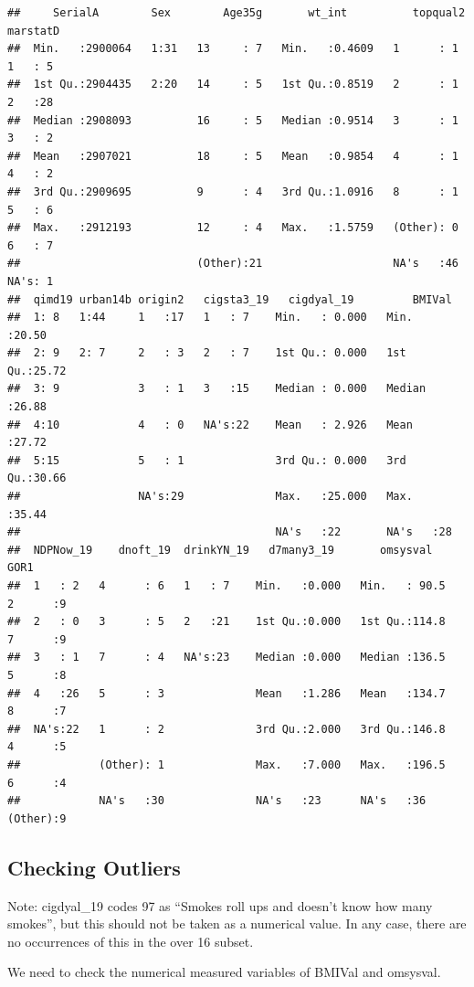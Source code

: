 \documentclass[
  11pt,
]{article}
\begin{document}
\begin{verbatim}
##     SerialA        Sex        Age35g       wt_int          topqual2  marstatD 
##  Min.   :2900064   1:31   13     : 7   Min.   :0.4609   1      : 1   1   : 5  
##  1st Qu.:2904435   2:20   14     : 5   1st Qu.:0.8519   2      : 1   2   :28  
##  Median :2908093          16     : 5   Median :0.9514   3      : 1   3   : 2  
##  Mean   :2907021          18     : 5   Mean   :0.9854   4      : 1   4   : 2  
##  3rd Qu.:2909695          9      : 4   3rd Qu.:1.0916   8      : 1   5   : 6  
##  Max.   :2912193          12     : 4   Max.   :1.5759   (Other): 0   6   : 7  
##                           (Other):21                    NA's   :46   NA's: 1  
##  qimd19 urban14b origin2   cigsta3_19   cigdyal_19         BMIVal     
##  1: 8   1:44     1   :17   1   : 7    Min.   : 0.000   Min.   :20.50  
##  2: 9   2: 7     2   : 3   2   : 7    1st Qu.: 0.000   1st Qu.:25.72  
##  3: 9            3   : 1   3   :15    Median : 0.000   Median :26.88  
##  4:10            4   : 0   NA's:22    Mean   : 2.926   Mean   :27.72  
##  5:15            5   : 1              3rd Qu.: 0.000   3rd Qu.:30.66  
##                  NA's:29              Max.   :25.000   Max.   :35.44  
##                                       NA's   :22       NA's   :28     
##  NDPNow_19    dnoft_19  drinkYN_19   d7many3_19       omsysval          GOR1  
##  1   : 2   4      : 6   1   : 7    Min.   :0.000   Min.   : 90.5   2      :9  
##  2   : 0   3      : 5   2   :21    1st Qu.:0.000   1st Qu.:114.8   7      :9  
##  3   : 1   7      : 4   NA's:23    Median :0.000   Median :136.5   5      :8  
##  4   :26   5      : 3              Mean   :1.286   Mean   :134.7   8      :7  
##  NA's:22   1      : 2              3rd Qu.:2.000   3rd Qu.:146.8   4      :5  
##            (Other): 1              Max.   :7.000   Max.   :196.5   6      :4  
##            NA's   :30              NA's   :23      NA's   :36      (Other):9
\end{verbatim}

\hypertarget{checking-outliers}{%
\subsection{Checking Outliers}\label{checking-outliers}}

Note: cigdyal\_19 codes 97 as ``Smokes roll ups and doesn't know how
many smokes'', but this should not be taken as a numerical value. In any
case, there are no occurrences of this in the over 16 subset.

We need to check the numerical measured variables of BMIVal and
omsysval.
\end{document}
